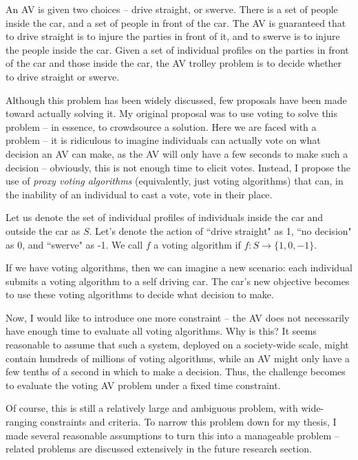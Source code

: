\begin{definition}
An AV is given two choices -- drive straight, or swerve. There is a set of people inside the car, and a set of people in front of the car. The AV is guaranteed that to drive straight is to injure the parties in front of it, and to swerve is to injure the people inside the car. Given a set of individual profiles on the parties in front of the car and those inside the car, the AV trolley problem is to decide whether to drive straight or swerve.
\end{definition}

Although this problem has been widely discussed, few proposals have been made toward actually solving it. My original proposal was to use voting to solve this problem -- in essence, to crowdsource a solution. Here we are faced with a problem -- it is ridiculous to imagine individuals can actually vote on what decision an AV can make, as the AV will only have a few seconds to make such a decision -- obviously, this is not enough time to elicit votes. Instead, I propose the use of \textit{proxy voting algorithms} (equivalently, just voting algorithms) that can, in the inability of an individual to cast a vote, vote in their place. 

\begin{definition}
Let us denote the set of individual profiles of individuals inside the car and outside the car as $S$. Let's denote the action of ``drive straight" as 1, ``no decision" as 0, and ``swerve" as -1. We call $f$ a voting algorithm if $f : S \rightarrow \{1,0,-1\}$.
\end{definition}

If we have voting algorithms, then we can imagine a new scenario: each individual submits a voting algorithm to a self driving car. The car's new objective becomes to use these voting algorithms to decide what decision to make. 

Now, I would like to introduce one more constraint -- the AV does not necessarily have enough time to evaluate all voting algorithms. Why is this? It seems reasonable to assume that such a system, deployed on a society-wide scale, might contain hundreds of millions of voting algorithms, while an AV might only have a few tenths of a second in which to make a decision. Thus, the challenge becomes to evaluate the voting AV problem under a fixed time constraint.

Of course, this is still a relatively large and ambiguous problem, with wide-ranging constraints and criteria. To narrow this problem down for my thesis, I made several reasonable assumptions to turn this into a manageable problem -- related problems are discussed extensively in the future research section.

